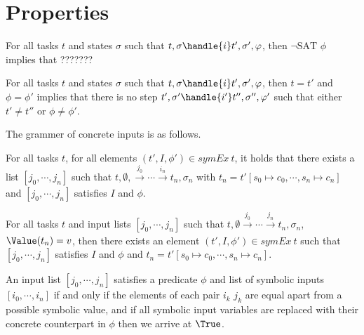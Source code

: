 


\section{Properties}
\label{sec:properties}


\begin{lemma}
For all tasks $t$ and states $\sigma$ such that $t,\sigma \handle{i} t',\sigma',\phi $,
then $\neg\text{SAT }\phi$ implies that ???????
\label{lemma:notSat}
\end{lemma}


\begin{lemma}
For all tasks $t$ and states $\sigma$ such that $t,\sigma \handle{i} t',\sigma',\phi$,
then $t=t'$ and $\phi=\phi'$ implies that there is no step $t',\sigma'\handle{i'} t'',\sigma'',\phi'$ such that either $t'\neq t''$ or $\phi\neq\phi'$.
\label{lemma:stuck}
\end{lemma}


The grammer of concrete inputs is as follows.


\begin{theorem}
\label{thm:sound}

For all tasks $t$, for all elements $(t',I,\phi')\in symEx\ t$, it holds that there
exists a list $[j_0,\cdots,j_n]$ such that $t,\emptyset,\xrightarrow[]{j_0}\cdots\xrightarrow[]{i_n} t_n,\sigma_n$ with $t_n=t'[s_0\mapsto c_0,\cdots,s_n\mapsto c_n]$ and $[j_0,\cdots,j_n]$ satisfies $I$ and $\phi$.
\end{theorem}



\begin{theorem}
For all tasks $t$ and input lists $[j_0,\cdots,j_n]$ such that $t,\emptyset\xrightarrow[]{j_0}\cdots\xrightarrow[]{j_n} t_n,\sigma_n$, $\Value(t_n)=v$, then there exists an element $(t',I,\phi')\in symEx\ t$ such that $[j_0,\cdots,j_n]$ satisfies $I$ and $\phi$ and $t_n=t'[s_0\mapsto c_0,\cdots,s_n\mapsto c_n]$.
  \label{thm:complete}
\end{theorem}


\begin{definition}
  An input list $[j_0,\cdots,j_n]$ satisfies a predicate $\phi$ and list of symbolic inputs $[i_0,\cdots,i_n]$ if and only if
  the elements of each pair $i_k$ $j_k$ are equal apart from a possible symbolic value, and if all symbolic input variables are replaced with their concrete counterpart in $\phi$ then we arrive at $\True$.
\end{definition}
